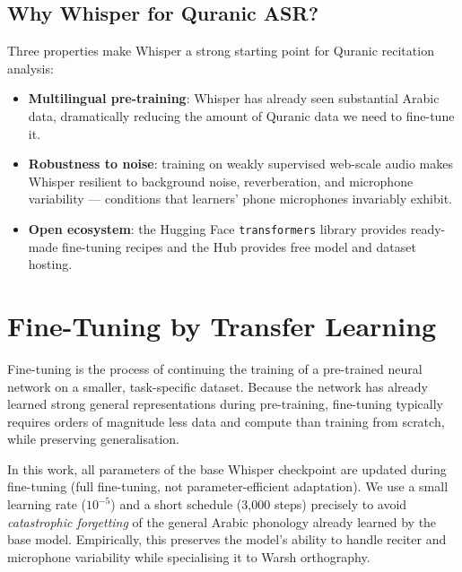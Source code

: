 \documentclass[12pt,a4paper]{report}
\begin{document}
\subsection{Why Whisper for Quranic ASR?}

Three properties make Whisper a strong starting point for Quranic
recitation analysis:
\begin{itemize}
  \item \textbf{Multilingual pre-training}: Whisper has already seen
        substantial Arabic data, dramatically reducing the amount of
        Quranic data we need to fine-tune it.
  \item \textbf{Robustness to noise}: training on weakly supervised
        web-scale audio makes Whisper resilient to background noise,
        reverberation, and microphone variability --- conditions that
        learners' phone microphones invariably exhibit.
  \item \textbf{Open ecosystem}: the Hugging Face \texttt{transformers}
        library provides ready-made fine-tuning recipes and the Hub
        provides free model and dataset hosting.
\end{itemize}

\section{Fine-Tuning by Transfer Learning}
\label{sec:mt_finetune}

\begin{emeraldbox}[title=Fine-Tuning]
Fine-tuning is the process of continuing the training of a pre-trained
neural network on a smaller, task-specific dataset. Because the network
has already learned strong general representations during pre-training,
fine-tuning typically requires orders of magnitude less data and compute
than training from scratch, while preserving generalisation.
\end{emeraldbox}

In this work, all parameters of the base Whisper checkpoint are updated
during fine-tuning (full fine-tuning, not parameter-efficient adaptation).
We use a small learning rate ($10^{-5}$) and a short schedule (3{,}000
steps) precisely to avoid \emph{catastrophic forgetting} of the general
Arabic phonology already learned by the base model. Empirically, this
preserves the model's ability to handle reciter and microphone variability
while specialising it to Warsh orthography.
\end{document}
